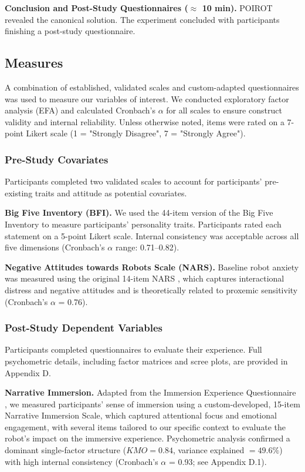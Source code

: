 \documentclass[sigconf,screen]{acmart-tagged}
\newcommand{\rev}[1]{#1}
\begin{document}
\noindent \textbf{Conclusion and Post-Study Questionnaires ($\approx$ 10 min).} POIROT revealed the canonical solution. The experiment concluded with participants finishing a post-study questionnaire.

\vspace{-8pt}
\subsection{Measures}
\rev{A combination of established, validated scales and custom-adapted questionnaires was used to measure our variables of interest. We conducted exploratory factor analysis (EFA) and calculated Cronbach's $\alpha$ for all scales to ensure construct validity and internal reliability. Unless otherwise noted, items were rated on a 7-point Likert scale (1 = "Strongly Disagree", 7 = "Strongly Agree").}

\vspace{-8pt}
\subsubsection{Pre-Study Covariates}
Participants completed two validated scales to account for participants' pre-existing traits and attitude as potential covariates.

\noindent \rev{\textbf{Big Five Inventory (BFI).}
We used the 44-item version of the Big Five Inventory \cite{john1999big} to measure participants' personality traits. Participants rated each statement on a 5-point Likert scale. Internal consistency was acceptable across all five dimensions (Cronbach's $\alpha$ range: 0.71--0.82).}

\noindent \rev{\textbf{Negative Attitudes towards Robots Scale (NARS).}
Baseline robot anxiety was measured using the original 14-item NARS \cite{nomura2006measurement}, which captures interactional distress and negative attitudes and is theoretically related to proxemic sensitivity \cite{mumm2011human} (Cronbach's $\alpha$ = 0.76).}

\vspace{-7pt}
\subsubsection{\rev{Post-Study Dependent Variables}}
Participants completed questionnaires to evaluate their experience. Full psychometric details, including factor matrices and scree plots, are provided in Appendix D.

\noindent \textbf{Narrative Immersion.}
Adapted from the Immersion Experience Questionnaire \cite{jennett2008measuring}, we measured participants' sense of immersion using a custom-developed, 15-item Narrative Immersion Scale, which captured attentional focus and emotional engagement, with several items tailored to our specific context to evaluate the robot's impact on the immersive experience. Psychometric analysis confirmed a dominant single-factor structure ($KMO = 0.84$, variance explained $= 49.6\%$) with high internal consistency (Cronbach's $\alpha$ = 0.93; see Appendix D.1).
\end{document}

